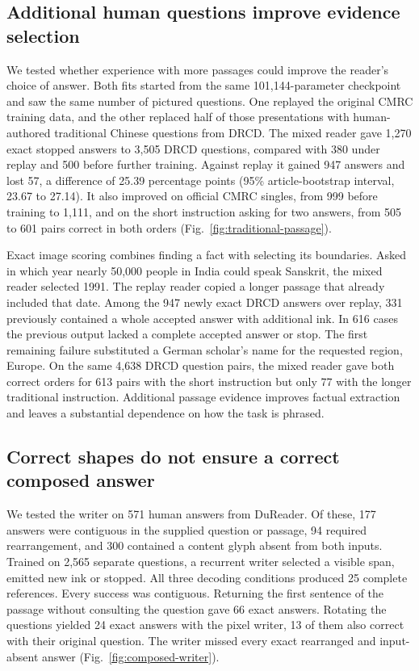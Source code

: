 \documentclass[12pt,a4paper]{article}
\providecommand{\DIFadd}[1]{{\protect\color{blue} \sf #1}} %
\begin{document}
\subsection*{\DIFadd{Additional human questions improve evidence selection}}
\DIFadd{We tested whether experience with more passages could improve the reader's choice of answer. Both fits started from the same 101,144-parameter checkpoint and saw the same number of pictured questions. One replayed the original CMRC training data, and the other replaced half of those presentations with human-authored traditional Chinese questions from DRCD. The mixed reader gave 1,270 exact stopped answers to 3,505 DRCD questions, compared with 380 under replay and 500 before further training. Against replay it gained 947 answers and lost 57, a difference of 25.39 percentage points (95\% article-bootstrap interval, 23.67 to 27.14). It also improved on official CMRC singles, from 999 before training to 1,111, and on the short instruction asking for two answers, from 505 to 601 pairs correct in both orders (Fig.~\ref{fig:traditional-passage}).
}

\DIFadd{Exact image scoring combines finding a fact with selecting its boundaries. Asked in which year nearly 50,000 people in India could speak Sanskrit, the mixed reader selected 1991. The replay reader copied a longer passage that already included that date. Among the 947 newly exact DRCD answers over replay, 331 previously contained a whole accepted answer with additional ink. In 616 cases the previous output lacked a complete accepted answer or stop. The first remaining failure substituted a German scholar's name for the requested region, Europe. On the same 4,638 DRCD question pairs, the mixed reader gave both correct orders for 613 pairs with the short instruction but only 77 with the longer traditional instruction. Additional passage evidence improves factual extraction and leaves a substantial dependence on how the task is phrased.
}

\subsection*{\DIFadd{Correct shapes do not ensure a correct composed answer}}
\DIFadd{We tested the writer on 571 human answers from DuReader. Of these, 177 answers were contiguous in the supplied question or passage, 94 required rearrangement, and 300 contained a content glyph absent from both inputs. Trained on 2,565 separate questions, a recurrent writer selected a visible span, emitted new ink or stopped. All three decoding conditions produced 25 complete references. Every success was contiguous. Returning the first sentence of the passage without consulting the question gave 66 exact answers. Rotating the questions yielded 24 exact answers with the pixel writer, 13 of them also correct with their original question. The writer missed every exact rearranged and input-absent answer (Fig.~\ref{fig:composed-writer}).
}
\end{document}
